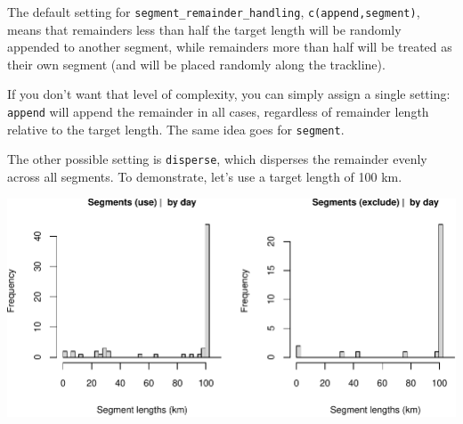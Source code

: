 \documentclass[
]{book}
\newenvironment{Shaded}{\begin{snugshade}}{\end{snugshade}}
\newcommand{\AttributeTok}[1]{\textcolor[rgb]{0.77,0.63,0.00}{#1}}
\newcommand{\CommentTok}[1]{\textcolor[rgb]{0.56,0.35,0.01}{\textit{#1}}}
\newcommand{\ConstantTok}[1]{\textcolor[rgb]{0.00,0.00,0.00}{#1}}
\newcommand{\DecValTok}[1]{\textcolor[rgb]{0.00,0.00,0.81}{#1}}
\newcommand{\FunctionTok}[1]{\textcolor[rgb]{0.00,0.00,0.00}{#1}}
\newcommand{\NormalTok}[1]{#1}
\newcommand{\OtherTok}[1]{\textcolor[rgb]{0.56,0.35,0.01}{#1}}
\newcommand{\SpecialCharTok}[1]{\textcolor[rgb]{0.00,0.00,0.00}{#1}}
\newcommand{\StringTok}[1]{\textcolor[rgb]{0.31,0.60,0.02}{#1}}
\begin{document}
The default setting for \texttt{segment\_remainder\_handling}, \texttt{c(\textquotesingle{}append\textquotesingle{},\textquotesingle{}segment\textquotesingle{})}, means that remainders less than half the target length will be randomly appended to another segment, while remainders more than half will be treated as their own segment (and will be placed randomly along the trackline).

If you don't want that level of complexity, you can simply assign a single setting: \texttt{\textquotesingle{}append\textquotesingle{}} will append the remainder in all cases, regardless of remainder length relative to the target length. The same idea goes for \texttt{\textquotesingle{}segment\textquotesingle{}}.

The other possible setting is \texttt{\textquotesingle{}disperse\textquotesingle{}}, which disperses the remainder evenly across all segments. To demonstrate, let's use a target length of 100 km.

\begin{Shaded}
\end{Shaded}

\includegraphics{figures/unnamed-chunk-400-1.pdf}
\end{document}

